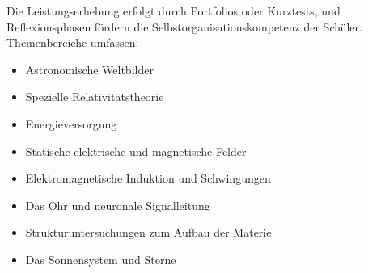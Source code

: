 Die Leistungserhebung erfolgt durch Portfolios oder Kurztests, und Reflexionsphasen fördern die Selbstorganisationskompetenz der Sch\"uler. Themenbereiche umfassen:

\begin{itemize}
	\item Astronomische Weltbilder
	\item Spezielle Relativitätstheorie
	\item Energieversorgung
	\item Statische elektrische und magnetische Felder
	\item Elektromagnetische Induktion und Schwingungen
	\item Das Ohr und neuronale Signalleitung
	\item Strukturuntersuchungen zum Aufbau der Materie
	\item Das Sonnensystem und Sterne
\end{itemize}




